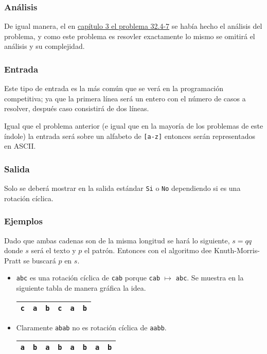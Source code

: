 \subsubsection{Análisis}
De igual manera, el en \hyperlink{cyclic_rotation}{capítulo 3 el problema 32.4-7} se había hecho el
análisis del problema, y como este problema es resovler exactamente lo mismo se omitirá el análisis
y su complejidad.

\subsubsection{Entrada}
Este tipo de entrada es la más común que se verá en la programación competitiva; ya que la primera
línea será un entero con el número de casos a resolver, después caso consistirá de dos líneas.

Igual que el problema anterior (e igual que en la mayoría de los problemas de este índole) la
entrada será sobre un alfabeto de \texttt{[a-z]} entonces serán representados en ASCII.

\subsubsection{Salida}
Solo se deberá mostrar en la salida estándar \texttt{Si} o \texttt{No} dependiendo si es una
rotación cíclica.

\subsubsection{Ejemplos}
Dado que ambas cadenas son de la misma longitud se hará lo siguiente, $s = qq$ donde $s$ será el
texto y $p$ el patrón. Entonces con el algoritmo dee Knuth-Morris-Pratt se buscará $p$ en $s$.

\begin{itemize}
\item \texttt{abc} es una rotación cíclica de \texttt{cab} porque \texttt{cab} $\mapsto$
\texttt{abc}. Se muestra en la siguiente tabla de manera gráfica la idea.
\begin{table}[h]
\centering
\begin{tabular}{|c|c|c|c|c|c|}
\hline
\texttt{c}                   &  \cellcolor{green}\texttt{a} &  \cellcolor{green}\texttt{b} &
\cellcolor{green} \texttt{c} &  \texttt{a}                  & \texttt{b}                   \\\hline
\end{tabular}
\end{table}

\item Claramente \texttt{abab} no es rotación cíclica de \texttt{aabb}.
\begin{table}[h]
\centering
\begin{tabular}{|c|c|c|c|c|c|c|c|}
\hline
\texttt{a} & \texttt{b} & \texttt{a} &\texttt{b} & \texttt{a} & \texttt{b} & \texttt{a} & \texttt{b} \\\hline
\end{tabular}
\end{table}
\end{itemize}

